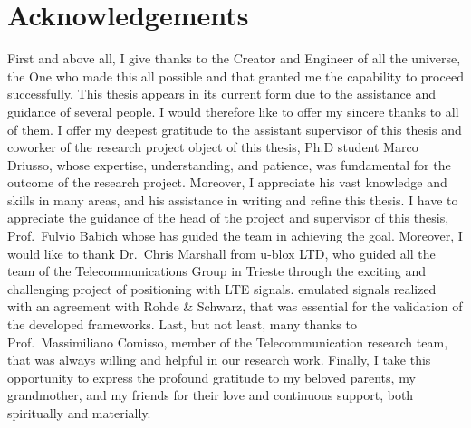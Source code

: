 \chapter*{Acknowledgements}
\label{chap:ack}

\vspace{4ex}
First and above all, I give thanks to the Creator and Engineer of all the universe, the One who made 
this all possible and that granted me the capability to proceed successfully. 
This thesis appears in its current form due to the assistance and guidance of several people. 
I would therefore like to offer my sincere thanks to all of them.
I offer my deepest gratitude to the assistant supervisor of this thesis and
coworker of the research project object of this thesis, Ph.D student Marco Driusso, whose expertise, 
understanding, and patience, was fundamental for the outcome of the research project. Moreover, I appreciate 
his vast knowledge and skills in many areas, and his assistance  in writing and refine this thesis.
I have to appreciate the guidance of the head of the project and supervisor of this thesis, Prof.~Fulvio 
Babich whose has guided the team in achieving the goal. 
Moreover, I would like to thank Dr.~Chris Marshall from u-blox LTD, who guided all the team of the 
Telecommunications Group in Trieste through the exciting and challenging project of positioning with 
LTE signals.
emulated signals realized with an agreement with Rohde \& Schwarz, that was essential for 
the validation of the developed frameworks.
Last, but not least, many thanks to Prof.~Massimiliano Comisso, member of the Telecommunication research team,  
that was always willing and helpful in our research work.
Finally, I take this opportunity to express the profound gratitude to my beloved parents, 
my grandmother, and my friends for their love and continuous support, both spiritually and materially.